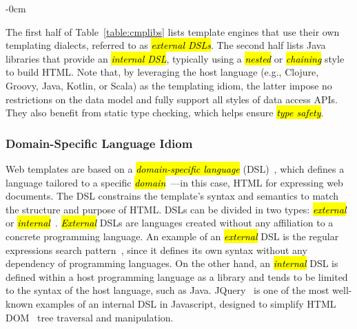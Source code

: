 \documentclass[software,article,accept,pdftex,moreauthors]{Definitions/mdpi}
\begin{document}
\begin{table}[H]
\begin{adjustwidth}{-\extralength}{0cm}
\end{adjustwidth}
  \label{table:cmplibs}
\end{table}

The first half of Table~\ref{table:cmplibs} lists template engines that use
their own templating dialects, referred to as \textit{\hl{external DSLs}}. The
second half lists Java libraries that provide an \textit{\hl{internal DSL}},
typically using a \textit{\hl{nested}} or \textit{\hl{chaining}} style to build HTML.
Note that, by leveraging the host language (e.g., Clojure, Groovy, Java,
Kotlin, or Scala) as the templating idiom, the latter impose no restrictions on
the data model and fully support all styles of data access APIs. They also
benefit from static type checking, which helps ensure \textit{\hl{type safety}}.


\subsubsection{Domain-Specific Language Idiom}\label{s2.1.1}

Web templates are based on a \textit{\hl{domain-specific language}}
(DSL)~\cite{landin1966next}, which defines a language tailored to a specific
\textit{\hl{domain}}~\cite{evans2004domain}---in this case, HTML for expressing web
documents. The DSL constrains the template's syntax and semantics to match the
structure and purpose of HTML.
DSLs can be divided in two types: \textit{\hl{external}} or
\textit{\hl{internal}}~\cite{dslbook}. \textit{\hl{External}} DSLs are languages created
without any affiliation to a concrete programming language. An example of an
\textit{\hl{external}} DSL is the regular expressions search
pattern~\cite{thompson1968}, since it defines its own syntax without any
dependency of programming languages. On the other hand, an \textit{\hl{internal}} DSL
is defined within a host programming language as a library and tends to be
limited to the syntax of the host language, such as Java.
JQuery~\cite{resig2007pro} is one of the most well-known examples of an internal
DSL in Javascript, designed to simplify HTML DOM~\cite{dom} tree traversal and
manipulation.
\end{document}
